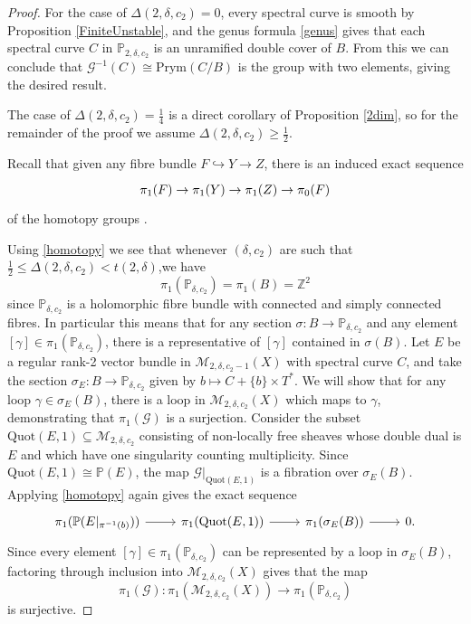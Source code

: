 \documentclass{article}[12pt]
\theoremstyle{definition}
\theoremstyle{remark}
\newcommand \Z{\mathbb Z}
\numberwithin{equation}{section}
\newcommand \mc{\mathcal}
\newcommand \mb{\mathbb}
\begin{document}
\begin{proof}
	For the case of $\Delta(2,\delta,c_2)=0$, every spectral curve is smooth by Proposition \ref{FiniteUnstable}, and the genus formula \eqref{genus} gives that each spectral curve $C$ in $\mb{P}_{2,\delta,c_2}$ is an unramified double cover of $B$. From this we can conclude that $\mc{G}^{-1}(C)\cong \text{Prym}(C/B)$ is the group with two elements, giving the desired result.
	
	The case of $\Delta(2,\delta,c_2)=\frac{1}{4}$ is a direct corollary of Proposition \ref{2dim}, so for the remainder of the proof we assume $\Delta(2,\delta,c_2)\geq \frac{1}{2}$.
	
	Recall that given any fibre bundle $F\hookrightarrow Y\to Z$, there is an induced exact sequence 
	\begin{equation}\begin{tikzcd}\label{homotopy}\pi_1(F)\to \pi_1(Y)\to \pi_1(Z)\to \pi_0(F) \end{tikzcd} \end{equation}
	of the homotopy groups \cite[Section 17]{BottTu}.
	
	Using \eqref{homotopy} we see that whenever $(\delta,c_2)$ are such that $\frac{1}{2}\leq \Delta(2,\delta,c_2)<t(2,\delta)$,we have $$\pi_1(\mb{P}_{\delta,c_2})=\pi_1(B)=\Z^2$$ since $\mb{P}_{\delta,c_2}$ is a holomorphic fibre bundle with connected and simply connected fibres. In particular this means that for any section $\sigma:B\to \mb{P}_{\delta,c_2}$ and any element $[\gamma]\in \pi_1(\mb{P}_{\delta,c_2})$, there is a representative of $[\gamma]$ contained in $\sigma(B)$. Let $E$ be a regular rank-2 vector bundle in $\mc{M}_{2,\delta,c_2-1}(X)$ with spectral curve $C$, and take the section $\sigma_E:B\to \mb{P}_{\delta,c_2}$ given by $b\mapsto C+\{b\}\times T^*$. We will show that for any loop $\gamma\in \sigma_E(B)$, there is a loop in $\mc{M}_{2,\delta,c_2}(X)$ which maps to $\gamma$, demonstrating that $\pi_1(\mc{G})$ is a surjection.
	Consider the subset $\text{Quot}(E,1)\subseteq \mc{M}_{2,\delta,c_2}$ consisting of non-locally free sheaves whose double dual is $E$ and which have one singularity counting multiplicity. Since $\text{Quot}(E,1)\cong \mb{P}(E)$, the map $\mc{G}|_{\text{Quot}(E,1)}$ is a fibration over $\sigma_E(B)$. Applying \eqref{homotopy} again gives the exact sequence $$\begin{tikzcd}
		\pi_1(\mb{P}(E|_{\pi^{-1}(b)}))\arrow[r] & \pi_1(\text{Quot}(E,1))\arrow[r] & \pi_1(\sigma_E(B))\arrow[r] & 0.
	\end{tikzcd}$$ 
	Since every element $[\gamma]\in \pi_1(\mb{P}_{\delta,c_2})$ can be represented by a loop in $\sigma_E(B)$, factoring through inclusion into $\mc{M}_{2,\delta,c_2}(X)$ gives that the map $$\pi_1(\mc{G}):\pi_1(\mc{M}_{2,\delta,c_2}(X))\to \pi_1(\mb{P}_{\delta,c_2})$$ is surjective. 
\end{proof}
\end{document}

